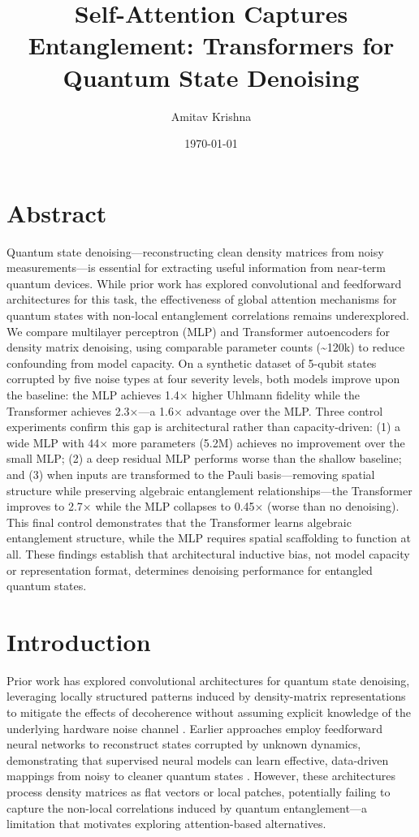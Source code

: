 \documentclass[11pt]{article}
\author{Amitav Krishna}
\date{\today}
\title{Self-Attention Captures Entanglement: Transformers for Quantum State Denoising}
\begin{document}
\maketitle
\section{Abstract}
\label{sec:org33fc62f}

Quantum state denoising—reconstructing clean density matrices from noisy measurements—is essential for extracting useful information from near-term quantum devices. While prior work has explored convolutional and feedforward architectures for this task, the effectiveness of global attention mechanisms for quantum states with non-local entanglement correlations remains underexplored. We compare multilayer perceptron (MLP) and Transformer autoencoders for density matrix denoising, using comparable parameter counts (\textasciitilde{}120k) to reduce confounding from model capacity. On a synthetic dataset of 5-qubit states corrupted by five noise types at four severity levels, both models improve upon the baseline: the MLP achieves 1.4× higher Uhlmann fidelity while the Transformer achieves 2.3×—a 1.6× advantage over the MLP. Three control experiments confirm this gap is architectural rather than capacity-driven: (1) a wide MLP with 44× more parameters (5.2M) achieves no improvement over the small MLP; (2) a deep residual MLP performs worse than the shallow baseline; and (3) when inputs are transformed to the Pauli basis—removing spatial structure while preserving algebraic entanglement relationships—the Transformer improves to 2.7× while the MLP collapses to 0.45× (worse than no denoising). This final control demonstrates that the Transformer learns algebraic entanglement structure, while the MLP requires spatial scaffolding to function at all. These findings establish that architectural inductive bias, not model capacity or representation format, determines denoising performance for entangled quantum states.
\section{Introduction}
\label{sec:org0241550}
Prior work has explored convolutional architectures for quantum state denoising, leveraging locally structured patterns induced by density-matrix representations to mitigate the effects of decoherence without assuming explicit knowledge of the underlying hardware noise channel \citep{kendre2025machinelearningquantumnoise}. Earlier approaches employ feedforward neural networks to reconstruct states corrupted by unknown dynamics, demonstrating that supervised neural models can learn effective, data-driven mappings from noisy to cleaner quantum states \citep{Morgillo_2024}. However, these architectures process density matrices as flat vectors or local patches, potentially failing to capture the non-local correlations induced by quantum entanglement—a limitation that motivates exploring attention-based alternatives.
\end{document}

